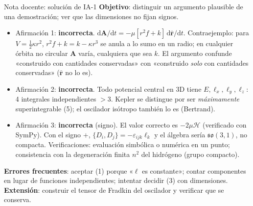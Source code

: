 \documentclass[aspectratio=169]{beamer}
\newif\ifdocente
\newcommand{\dd}{\mathrm{d}}
\newcommand{\vA}{\mathbf A}
\newcommand{\vl}{\boldsymbol\ell}
\newcommand{\rh}{\hat{\mathbf r}}
\newcommand{\PB}[2]{\{#1,#2\}}
\newcommand{\Hc}{\mathcal H}
\begin{document}
\ifdocente
\begin{frame}{Nota docente: solución de IA-1}
\footnotesize
\textbf{Objetivo}: distinguir un argumento plausible de una demostración; ver que las
dimensiones no fijan signos.
\begin{itemize}
  \item Afirmación 1: \textbf{incorrecta}. $\dd\vA/\dd t=-\mu[r^{2}f+k]\,\dd\rh/\dd t$.
        Contraejemplo: para $V=\frac12\kappa r^{2}$, $r^{2}f+k=k-\kappa r^{3}$ se anula a lo sumo en
        un radio; en cualquier órbita no circular $\vA$ varía, cualquiera que sea $k$. El argumento confunde «construido con cantidades conservadas» con
        «construido \emph{solo} con cantidades conservadas» ($\rh$ no lo es).
  \item Afirmación 2: \textbf{incorrecta}. Todo potencial central en 3D tiene $E,\ell_x,\ell_y,\ell_z$:
        4 integrales independientes $>3$. Kepler se distingue por ser \emph{máximamente}
        superintegrable (5); el oscilador isótropo también lo es (Bertrand).
  \item Afirmación 3: \textbf{incorrecta} (signo). El valor correcto es $-2\mu\Hc$ (verificado
        con SymPy). Con el signo $+$, $\PB{D_i}{D_j}=-\varepsilon_{ijk}\ell_k$ y el álgebra sería
        $\mathfrak{so}(3,1)$, no compacta. Verificaciones: evaluación simbólica o numérica en un
        punto; consistencia con la degeneración finita $n^{2}$ del hidrógeno (grupo compacto).
\end{itemize}
\textbf{Errores frecuentes}: aceptar (1) porque «$\vl$ es constante»; contar componentes en
lugar de funciones independientes; intentar decidir (3) con dimensiones.
\textbf{Extensión}: construir el tensor de Fradkin del oscilador y verificar que se conserva.
\end{frame}
\end{document}
